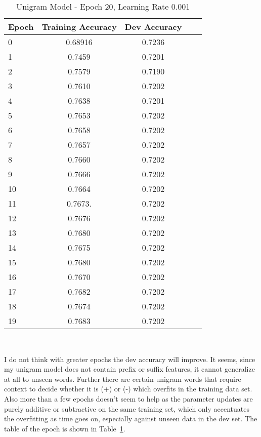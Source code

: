 \documentclass[11pt]{article}
\begin{document}
\begin{table}
	\begin{center}
		\begin{tabular}{l|c|c|c|c|}
		\textbf{Epoch} & \textbf{Training Accuracy} & \textbf{Dev Accuracy} \\
		\hline
		0 & 0.68916 & 0.7236  \\
		1 & 0.7459 & 0.7201 \\
		2 & 0.7579 & 0.7190  \\
		3 & 0.7610 & 0.7202 \\
		4 & 0.7638 & 0.7201 \\
		5 & 0.7653 & 0.7202\\
		6 & 0.7658 & 0.7202 \\
		7 & 0.7657 & 0.7202 \\
		8 & 0.7660 & 0.7202 \\
		9 & 0.7666 & 0.7202 \\
		10 & 0.7664 & 0.7202 \\
		11 & 0.7673. & 0.7202 \\
		12 & 0.7676 & 0.7202 \\
		13 & 0.7680 & 0.7202 \\
		14 & 0.7675 & 0.7202 \\
		15 & 0.7680 & 0.7202 \\
		16 & 0.7670 & 0.7202 \\
		17 & 0.7682 & 0.7202 \\
		18 & 0.7674 & 0.7202 \\
		19 & 0.7683 & 0.7202 \\
		\end{tabular}\
		\caption{Unigram Model - Epoch 20, Learning Rate 0.001}
		\label{tbl:unigram}
	\end{center}
\end{table}
                                                                                                                                                                                                                                 
I do not think with greater epochs the dev accuracy will improve. It seems, since my unigram model does not contain prefix or suffix features, it cannot generalize at all to unseen words. Further there
are certain unigram words that require context to decide whether it is (+) or (-) which overfits in the training data set. Also more than a few epochs doesn't seem to help as the parameter updates are
purely additive or subtractive on the same training set, which only accentuates the overfitting as time goes on, especially against unseen data in the dev set. The table of the epoch is shown in Table~\ref{tbl:unigram}.
\end{document}
